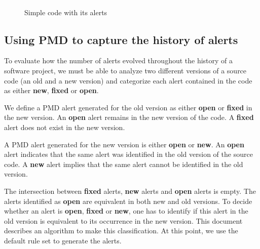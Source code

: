 \documentclass[
]{article}
\begin{document}
\normalsize



\begin{figure}
\centering
\includegraphics{figures/fake.png}
\caption{Simple code with its alerts \label{simple_code}}
\end{figure}


\subsection{Using PMD to capture the history of alerts}\label{history}

To evaluate how the number of alerts evolved throughout the history of a
software project, we must be able to analyze two different versions of a
source code (an old and a new version) and categorize each alert
contained in the code as either \textbf{new}, \textbf{fixed} or
\textbf{open}.

We define a PMD alert generated for the old version as either
\textbf{open} or \textbf{fixed} in the new version. An \textbf{open}
alert remains in the new version of the code. A \textbf{fixed} alert
does not exist in the new version.

A PMD alert generated for the new version is either \textbf{open} or
\textbf{new}. An \textbf{open} alert indicates that the same alert was
identified in the old version of the source code. A \textbf{new} alert
implies that the same alert cannot be identified in the old version.

The intersection between \textbf{fixed} alerts, \textbf{new} alerts and
\textbf{open} alerts is empty. The alerts identified as \textbf{open}
are equivalent in both new and old versions. To decide whether an alert
is \textbf{open}, \textbf{fixed} or \textbf{new}, one has to identify if
this alert in the old version is equivalent to its occurrence in the new
version. This document describes an algorithm to make this classification. 
At this point, we use the default rule set to generate the alerts.

\end{document}
